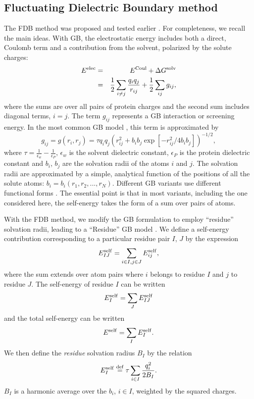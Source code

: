 \documentclass[a4paper,12pt]{article}
\begin{document}
\subsection{Fluctuating Dielectric Boundary method}
The FDB method was proposed and tested earlier \cite{Archontis05b,Aleksandrov10b}. For completeness, we recall the main
ideas. With GB, the electrostatic energy includes both a direct, Coulomb term and a contribution from the solvent, polarized
by the solute charges:
\begin{eqnarray}
E^{\rm elec} &=& E^{\rm Coul} + \Delta G^{\rm solv} \nonumber \\ 
             &=& \frac{1}{2} \sum_{i \neq j} \frac{q_i q_j}{r_{ij}}  + \frac{1}{2} \sum_{i j} g_{ij}, \label{eq:solv}
\end{eqnarray}
where the sums are over all pairs of protein charges and the second sum includes diagonal terms, $i=j$. The term $g_{ij}$
represents a GB interaction or screening energy. In the most common GB model \cite{Still90}, this term is approximated by
\begin{equation} \label{eq:atomic}
g_{ij} = g(r_i,r_j) = \tau q_i q_j \left( r_{ij}^2 + b_i b_j \exp[-r_{ij}^2/4 b_i b_j] \right)^{-1/2},
\end{equation}
where $\tau = \frac{1}{\epsilon_w} -\frac{1}{\epsilon_P}$, $\epsilon_w$ is the solvent dielectric constant, $\epsilon_P$
is the protein dielectric constant and $b_i$, $b_j$ are the solvation radii of the atoms $i$ and $j$. The solvation radii
are approximated by a simple, analytical function of the positions of all the solute atoms: $b_i = b_i(r_1,r_2,...,r_N)$.
Different GB variants use different functional forms \cite{Still90,Hawkins95,Schaefer96,Qiu97,Ghosh98,Lee02,Onufriev02}.
The essential point is that in most variants, including the one considered here, the self-energy takes the form of a sum
over pairs of atoms.

With the FDB method, we modify the GB formulation to employ ``residue'' solvation radii, leading to a ``Residue'' GB model
\cite{Archontis05b}. We define a self-energy contribution corresponding to a particular residue pair $I$, $J$ by the expression 
\begin{equation} \label{eq:selfRR}
E^{\rm self}_{IJ} = \sum_{i \in I, j \in J} E_{ij}^{\rm self},
\end{equation}
where the sum extends over atom pairs where $i$ belongs to residue $I$ and $j$ to residue $J$. The self-energy of residue 
$I$ can be written 
\begin{equation} \label{eq:self1}
E^{\rm self}_I = \sum_J E^{\rm self}_{IJ}
\end{equation}
and the total self-energy can be written 
\begin{equation} \label{eq:self2}
E^{\rm self} = \sum_I E^{\rm self}_I.
\end{equation}
We then define the {\it residue} solvation radius $B_I$ by the relation
\begin{equation} \label{eq:defB}
E^{\rm self}_I \stackrel{\rm def}{=} \tau \sum_{i \in I} \frac{q_i^2}{2 B_I}.
\end{equation}
$B_I$ is a harmonic average over the $b_i$, $i \in I$, weighted by the squared charges.
\end{document}

